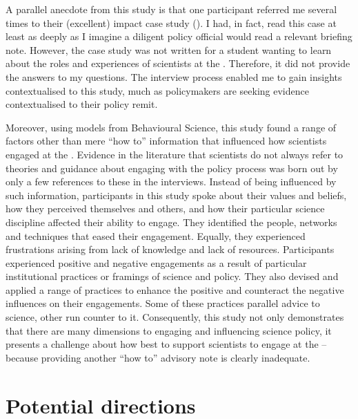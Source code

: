 A parallel anecdote from this study is that one participant referred me several times to their (excellent) impact case study (). I had, in fact, read this case at least as deeply as I imagine a diligent policy official would read a relevant briefing note. However, the case study was not written for a student wanting to learn about the roles and experiences of scientists at the \CAN{} \SPI. Therefore, it did not provide the answers to my questions. The interview process enabled me to gain insights contextualised to this study, much as policymakers are seeking evidence contextualised to their policy remit. 

Moreover, using models from Behavioural Science, this study found a range of factors other than mere ``how to'' information that influenced how scientists engaged at the \SPI. Evidence in the literature that scientists do not always refer to theories and guidance about engaging with the policy process was born out by only a few references to these in the interviews. Instead of being influenced by such information, participants in this study spoke about their values and beliefs, how they perceived themselves and others, and how their particular science discipline affected their ability to engage. They identified the people, networks and techniques that eased their engagement. Equally, they experienced frustrations arising from lack of knowledge and lack of resources. Participants experienced positive and negative engagements as a result of particular institutional practices or framings of \CAN{} science and policy. They also devised and applied a range of practices to enhance the positive and counteract the negative influences on their engagements. Some of these practices parallel advice to science, other run counter to it. Consequently, this study not only demonstrates that there are many dimensions to engaging and influencing \CAN{} science policy, it presents a challenge about how best to support scientists to engage at the \SPI{} -- because providing another ``how to'' advisory note is clearly inadequate.


\section{Potential directions}\label{sec:disdirections}

